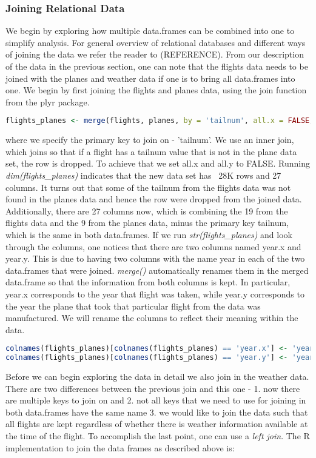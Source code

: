\subsubsection*{Joining Relational Data}
We begin by exploring how multiple data.frames can be combined into one to simplify analysis. For general overview of relational databases and different ways of joining the data we refer the reader to (REFERENCE). From our description of the data in the previous section, one can note that the flights data needs to be joined with the planes and weather data if one is to bring all data.frames into one. We begin by first joining the flights and planes data, using the join function from the plyr package.
\begin{lstlisting}[language=R]
flights_planes <- merge(flights, planes, by = 'tailnum', all.x = FALSE, all.y = FALSE)
\end{lstlisting}
where we specify the primary key to join on - 'tailnum'. We use an inner join, which joins so that if a flight has a tailnum value that is not in the plane data set, the row is dropped. To achieve that we set all.x and all.y to FALSE. Running \textit{dim(flights\_planes)} indicates that the new data set has ~28K rows and 27 columns. It turns out that some of the tailnum from the flights data was not found in the planes data and hence the row were dropped from the joined data. Additionally, there are 27 columns now, which is combining the 19 from the flights data and the 9 from the planes data, minus the primary key tailnum, which is the same in both data.frames. If we run \textit{str(flights\_planes)} and look through the columns, one notices that there are two columns named year.x and year.y. This is due to having two columns with the name year in each of the two data.frames that were joined. \textit{merge()} automatically renames them in the merged data.frame so that the information from both columns is kept. In particular, year.x corresponds to the year that flight was taken, while year.y corresponds to the year the plane that took that particular flight from the data was manufactured. We will rename the columns to reflect their meaning within the data.
\begin{lstlisting}[language=R]
colnames(flights_planes)[colnames(flights_planes) == 'year.x'] <- 'year'
colnames(flights_planes)[colnames(flights_planes) == 'year.y'] <- 'year_manufactured'
\end{lstlisting}
Before we can begin exploring the data in detail we also join in the weather data. There are two differences between the previous join and this one - 1. now there are multiple keys to join on and 2. not all keys that we need to use for joining in both data.frames have the same name 3. we would like to join the data such that all flights are kept regardless of whether there is weather information available at the time of the flight. To accomplish the last point, one can use a \textit{left join}. The R implementation to join the data frames as described above is:
